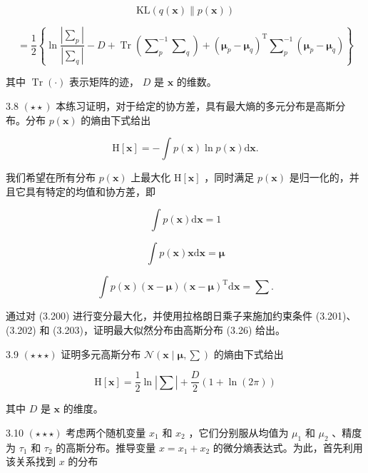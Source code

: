 \documentclass[10pt]{article}
\begin{document}
\[
\mathrm{{KL}}\left( {q\left( \mathbf{x}\right) \parallel p\left( \mathbf{x}\right) }\right)
\]

\[
= \frac{1}{2}\left\{  {\ln \frac{\left| {\mathbf{\sum }}_{p}\right| }{\left| {\mathbf{\sum }}_{q}\right| } - D + \operatorname{Tr}\left( {{\mathbf{\sum }}_{p}^{-1}{\mathbf{\sum }}_{q}}\right)  + {\left( {\mathbf{\mu }}_{p} - {\mathbf{\mu }}_{q}\right) }^{\mathrm{T}}{\mathbf{\sum }}_{p}^{-1}\left( {{\mathbf{\mu }}_{p} - {\mathbf{\mu }}_{q}}\right) }\right\}   \tag{3.199}
\]

其中 \(\operatorname{Tr}\left( \cdot \right)\) 表示矩阵的迹， \(D\) 是 \(\mathbf{x}\) 的维数。

3.8 \(\left( {\star  \star  }\right)\) 本练习证明，对于给定的协方差，具有最大熵的多元分布是高斯分布。分布 \(p\left( \mathbf{x}\right)\) 的熵由下式给出

\[
\mathrm{H}\left\lbrack  \mathbf{x}\right\rbrack   =  - \int p\left( \mathbf{x}\right) \ln p\left( \mathbf{x}\right) \mathrm{d}\mathbf{x}. \tag{3.200}
\]

我们希望在所有分布 \(p\left( \mathbf{x}\right)\) 上最大化 \(\mathrm{H}\left\lbrack  \mathbf{x}\right\rbrack\) ，同时满足 \(p\left( \mathbf{x}\right)\) 是归一化的，并且它具有特定的均值和协方差，即

\[
\int p\left( \mathbf{x}\right) \mathrm{d}\mathbf{x} = 1 \tag{3.201}
\]

\[
\int p\left( \mathbf{x}\right) \mathbf{x}\mathrm{d}\mathbf{x} = \mathbf{\mu } \tag{3.202}
\]

\[
\int p\left( \mathbf{x}\right) \left( {\mathbf{x} - \mathbf{\mu }}\right) {\left( \mathbf{x} - \mathbf{\mu }\right) }^{\mathrm{T}}\mathrm{d}\mathbf{x} = \mathbf{\sum }. \tag{3.203}
\]

通过对 (3.200) 进行变分最大化，并使用拉格朗日乘子来施加约束条件 (3.201)、(3.202) 和 (3.203)，证明最大似然分布由高斯分布 (3.26) 给出。

3.9 \(\left( {\star  \star   \star  }\right)\) 证明多元高斯分布 \(\mathcal{N}\left( {\mathbf{x} \mid  \mathbf{\mu },\mathbf{\sum }}\right)\) 的熵由下式给出

\[
\mathrm{H}\left\lbrack  \mathbf{x}\right\rbrack   = \frac{1}{2}\ln \left| \mathbf{\sum }\right|  + \frac{D}{2}\left( {1 + \ln \left( {2\pi }\right) }\right)  \tag{3.204}
\]

其中 \(D\) 是 \(\mathbf{x}\) 的维度。

3.10 \(\left( {\star  \star   \star  }\right)\) 考虑两个随机变量 \({x}_{1}\) 和 \({x}_{2}\) ，它们分别服从均值为 \({\mu }_{1}\) 和 \({\mu }_{2}\) 、精度为 \({\tau }_{1}\) 和 \({\tau }_{2}\) 的高斯分布。推导变量 \(x = {x}_{1} + {x}_{2}\) 的微分熵表达式。为此，首先利用该关系找到 \(x\) 的分布
\end{document}
